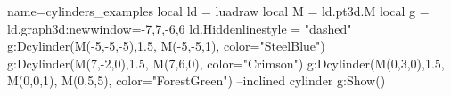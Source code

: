 \documentclass{standalone}%
\begin{document}
\begin{luadraw}{name=cylinders_examples}
local ld = luadraw
local M = ld.pt3d.M
local g = ld.graph3d:new{window={-7,7,-6,6}}
ld.Hiddenlinestyle = "dashed"
g:Dcylinder(M(-5,-5,-5),1.5, M(-5,-5,1), {color="SteelBlue"})
g:Dcylinder(M(7,-2,0),1.5, M(7,6,0), {color="Crimson"}) 
g:Dcylinder(M(0,3,0),1.5, M(0,0,1), M(0,5,5), {color="ForestGreen"}) --inclined cylinder
g:Show()
\end{luadraw}
\end{document}
